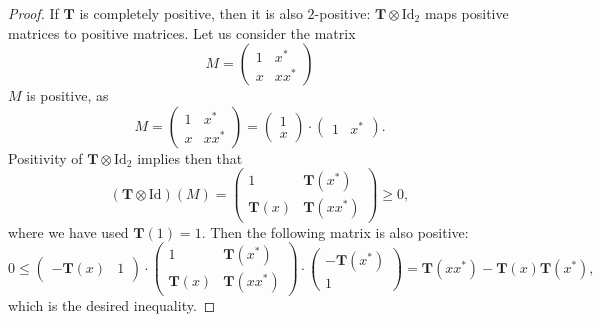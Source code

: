 \documentclass{article}
\newcommand{\id}{\mathrm{Id}}
\begin{document}
\begin{proof}
  If $\mathbf{T}$ is completely positive, then it is also $2$-positive: $\mathbf{T}\otimes \id_2$ maps positive matrices to positive matrices. Let us consider the matrix 
  \begin{equation*}
   M = \left(\begin{matrix} 1 & x^* \\ x & xx^* \end{matrix}\right)
  \end{equation*}
  $M$ is positive, as 
  \begin{equation*}
   M = \left(\begin{matrix} 1 & x^* \\ x & xx^* \end{matrix}\right)
   = \left(\begin{matrix} 1  \\ x \end{matrix}\right) \cdot \left(\begin{matrix} 1 & x^*  \end{matrix}\right). 
  \end{equation*}
  Positivity of $\mathbf{T}\otimes \id_2$ implies then that 
  \begin{equation*}
   (\mathbf{T}\otimes\id)(M) = \left(\begin{matrix} 1 & \mathbf{T}(x^*) \\ \mathbf{T}(x) & \mathbf{T}(xx^*) \end{matrix}\right) \geq 0, 
  \end{equation*}
  where we have used $\mathbf{T}(1)=1$. Then the following matrix is also positive:
  \begin{equation*}
   0 \leq \left(\begin{matrix} -\mathbf{T}(x) & 1 \end{matrix}\right) \cdot
          \left(\begin{matrix} 1 & \mathbf{T}(x^*) \\ \mathbf{T}(x) & \mathbf{T}(xx^*) \end{matrix}\right) \cdot
          \left(\begin{matrix} -\mathbf{T}(x^*) \\ 1 \end{matrix}\right) = \mathbf{T}(xx^*) - \mathbf{T}(x)\mathbf{T}(x^*),
  \end{equation*}
  which is the desired inequality.
  

\end{proof}
\end{document}
